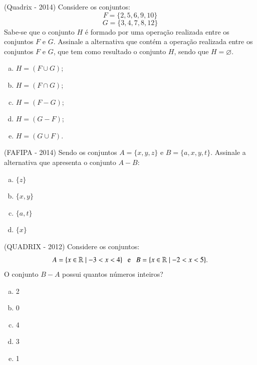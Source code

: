 \begin{exer}
 (Quadrix - 2014)  Considere os conjuntos:
      \[F = \{2, 5, 6, 9,10 \}\]
      \[G = \{3, 4, 7, 8, 12\}\]
 Sabe-se que o conjunto $H$ é formado por uma operação realizada entre os conjuntos $F$ e $G$. Assinale a alternativa que  contém a operação realizada entre os conjuntos $F$ e $G$, que tem como resultado o conjunto $H$, sendo que $H = \varnothing$.
 \begin{enumerate}[a)]
  \item $H= (F \cup G)$;
  \item $H= (F \cap G)$;
  \item $H= (F - G)$;
  \item $H= (G - F)$;
  \item $H= (G \cup F)$.
 \end{enumerate}
\end{exer}

\begin{exer}
 (FAFIPA - 2014) Sendo os conjuntos $A = \{ x,y,z \}$ e $B =  \{a, x,y,t\}$. Assinale a alternativa que apresenta o conjunto $A - B$:
 \begin{multicols}{5}
 \begin{enumerate}[a)]
  \item $\{ z \}$
  \item $\{ x, y \}$
  \item $\{a, t\}$
  \item  $\{x\}$
 \end{enumerate}
 \end{multicols}
\end{exer}

\begin{exer}
(QUADRIX - 2012) Considere os conjuntos:
  \[ A = \{ x \in \R \mid - 3 < x < 4 \} \ \ \text{ e } \ \ B = \{ x \in \R \mid - 2 < x < 5 \}.\]
 O conjunto $B - A$ possui quantos números inteiros?
 \begin{multicols}{5}
 \begin{enumerate}[a)]
  \item 2
  \item 0
  \item 4
  \item 3
  \item 1
 \end{enumerate}
 \end{multicols}
 \end{exer}

